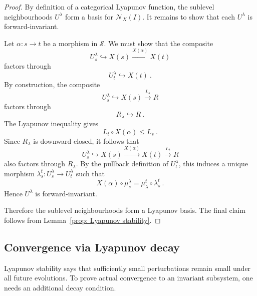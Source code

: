 \documentclass[a4paper,reqno,oneside]{amsart}
\theoremstyle{definition}
\theoremstyle{remark}
\numberwithin{equation}{section}
\begin{document}
\begin{proof}
By definition of a categorical Lyapunov function, the sublevel
neighbourhoods $U^\lambda$ form a basis for $\mathcal N_X(I)$. It remains to
show that each $U^\lambda$ is forward-invariant.

Let $\alpha\colon s\to t$ be a morphism in $\mathcal S$. We must show that
the composite
\begin{equation}
    U^\lambda_s\hookrightarrow X(s)\xrightarrow{X(\alpha)}X(t)
\end{equation}
factors through
\begin{equation}
    U^\lambda_t\hookrightarrow X(t) \ .
\end{equation}
By construction, the composite
\begin{equation}
    U^\lambda_s\hookrightarrow X(s)\xrightarrow{L_s}R
\end{equation}
factors through
\begin{equation}
    R_\lambda\hookrightarrow R \ .
\end{equation}
The Lyapunov inequality gives
\begin{equation}
    L_t\circ X(\alpha)\leq L_s \ .
\end{equation}
Since $R_\lambda$ is downward closed, it follows that
\begin{equation}
    U^\lambda_s\hookrightarrow X(s)
    \xrightarrow{X(\alpha)}X(t)
    \xrightarrow{L_t}R
\end{equation}
also factors through $R_\lambda$. By the pullback definition of
$U^\lambda_t$, this induces a unique morphism $\lambda_s^t\colon U_s^\lambda \to U_t^\lambda$ such that
\begin{equation}
    X(\alpha) \circ \mu_s^\lambda = \mu_\lambda^t \circ \lambda_s^t \ .
\end{equation}
Hence $U^\lambda$ is forward-invariant.

Therefore the sublevel neighbourhoods form a Lyapunov basis. The final claim
follows from Lemma~\ref{prop: Lyapunov stability}.
\end{proof}

\subsection{Convergence via Lyapunov decay}

Lyapunov stability says that sufficiently small perturbations remain small
under all future evolutions. To prove actual convergence to an invariant
subsystem, one needs an additional decay condition.
\end{document}
